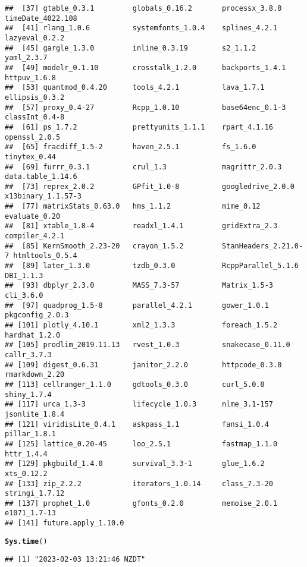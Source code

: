 \documentclass{article}\usepackage[]{graphicx}\usepackage[]{xcolor}
\makeatletter
\newcommand{\hlstd}[1]{\textcolor[rgb]{0.345,0.345,0.345}{#1}}%
\newcommand{\hlkwd}[1]{\textcolor[rgb]{0.737,0.353,0.396}{\textbf{#1}}}%
\newenvironment{kframe}{%
 \def\at@end@of@kframe{}%
 \ifinner\ifhmode%
  \def\at@end@of@kframe{\end{minipage}}%
  \begin{minipage}{\columnwidth}%
 \fi\fi%
 \def\FrameCommand##1{\hskip\@totalleftmargin \hskip-\fboxsep
 \colorbox{shadecolor}{##1}\hskip-\fboxsep
     \hskip-\linewidth \hskip-\@totalleftmargin \hskip\columnwidth}%
 \MakeFramed {\advance\hsize-\width
   \@totalleftmargin\z@ \linewidth\hsize
   \@setminipage}}%
 {\par\unskip\endMakeFramed%
 \at@end@of@kframe}
\newenvironment{knitrout}{}{} %
\makeatother
\begin{document}
\begin{knitrout}
\begin{kframe}
\begin{verbatim}
##  [37] gtable_0.3.1         globals_0.16.2       processx_3.8.0       timeDate_4022.108   
##  [41] rlang_1.0.6          systemfonts_1.0.4    splines_4.2.1        lazyeval_0.2.2      
##  [45] gargle_1.3.0         inline_0.3.19        s2_1.1.2             yaml_2.3.7          
##  [49] modelr_0.1.10        crosstalk_1.2.0      backports_1.4.1      httpuv_1.6.8        
##  [53] quantmod_0.4.20      tools_4.2.1          lava_1.7.1           ellipsis_0.3.2      
##  [57] proxy_0.4-27         Rcpp_1.0.10          base64enc_0.1-3      classInt_0.4-8      
##  [61] ps_1.7.2             prettyunits_1.1.1    rpart_4.1.16         openssl_2.0.5       
##  [65] fracdiff_1.5-2       haven_2.5.1          fs_1.6.0             tinytex_0.44        
##  [69] furrr_0.3.1          crul_1.3             magrittr_2.0.3       data.table_1.14.6   
##  [73] reprex_2.0.2         GPfit_1.0-8          googledrive_2.0.0    x13binary_1.1.57-3  
##  [77] matrixStats_0.63.0   hms_1.1.2            mime_0.12            evaluate_0.20       
##  [81] xtable_1.8-4         readxl_1.4.1         gridExtra_2.3        compiler_4.2.1      
##  [85] KernSmooth_2.23-20   crayon_1.5.2         StanHeaders_2.21.0-7 htmltools_0.5.4     
##  [89] later_1.3.0          tzdb_0.3.0           RcppParallel_5.1.6   DBI_1.1.3           
##  [93] dbplyr_2.3.0         MASS_7.3-57          Matrix_1.5-3         cli_3.6.0           
##  [97] quadprog_1.5-8       parallel_4.2.1       gower_1.0.1          pkgconfig_2.0.3     
## [101] plotly_4.10.1        xml2_1.3.3           foreach_1.5.2        hardhat_1.2.0       
## [105] prodlim_2019.11.13   rvest_1.0.3          snakecase_0.11.0     callr_3.7.3         
## [109] digest_0.6.31        janitor_2.2.0        httpcode_0.3.0       rmarkdown_2.20      
## [113] cellranger_1.1.0     gdtools_0.3.0        curl_5.0.0           shiny_1.7.4         
## [117] urca_1.3-3           lifecycle_1.0.3      nlme_3.1-157         jsonlite_1.8.4      
## [121] viridisLite_0.4.1    askpass_1.1          fansi_1.0.4          pillar_1.8.1        
## [125] lattice_0.20-45      loo_2.5.1            fastmap_1.1.0        httr_1.4.4          
## [129] pkgbuild_1.4.0       survival_3.3-1       glue_1.6.2           xts_0.12.2          
## [133] zip_2.2.2            iterators_1.0.14     class_7.3-20         stringi_1.7.12      
## [137] prophet_1.0          gfonts_0.2.0         memoise_2.0.1        e1071_1.7-13        
## [141] future.apply_1.10.0
\end{verbatim}
\begin{alltt}
\hlkwd{Sys.time}\hlstd{()}
\end{alltt}
\begin{verbatim}
## [1] "2023-02-03 13:21:46 NZDT"
\end{verbatim}
\end{kframe}
\end{knitrout}
\end{document}
